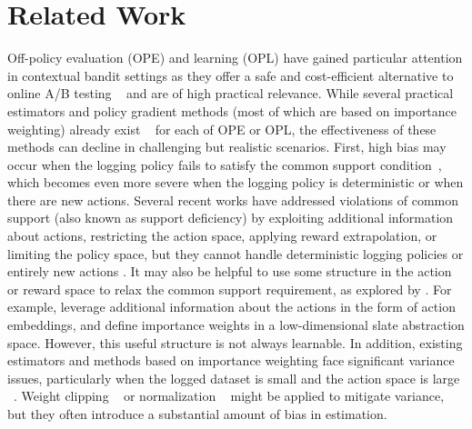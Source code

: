 \appendix
\section{Related Work} \label{app:related}
Off-policy evaluation (OPE) and learning (OPL) have gained particular attention in contextual bandit settings as they offer a safe and cost-efficient alternative to online A/B testing ~\citep{mehrotra2018towards,gilotte2018offline,saito2021evaluating,kiyohara2024towards} and are of high practical relevance. While several practical estimators and policy gradient methods (most of which are based on importance weighting) already exist ~\citep{saito2021counterfactual,uehara2022review,dudik2014doubly,wang2017optimal,su2020doubly} for each of OPE or OPL, the effectiveness of these methods can decline in challenging but realistic scenarios. First, high bias may occur when the logging policy fails to satisfy the common support condition~\citep{sachdeva2020off}, which becomes even more severe when the logging policy is deterministic or when there are new actions. Several recent works have addressed violations of common support (also known as support deficiency) by exploiting additional information about actions, restricting the action space, applying reward extrapolation, or limiting the policy space, but they cannot handle deterministic logging policies or entirely new actions \citep{felicioni2022off, sachdeva2020off}. It may also be helpful to use some structure in the action or reward space to relax the common support requirement, as explored by \cite{saito2022off,saito2023off,cief2024learning,taufiq2024marginal,sachdeva2024off,kiyohara2024off}. For example, \cite{saito2022off} leverage additional information about the actions in the form of action embeddings, and \cite{kiyohara2023off} define importance weights in a low-dimensional slate abstraction space. However, this useful structure is not always learnable.
In addition, existing estimators and methods based on importance weighting face significant variance issues, particularly when the logged dataset is small and the action space is large ~\citep{saito2022off,cief2024learning,sachdeva2024off}. Weight clipping ~\citep{swaminathan2015counterfactual,su2020doubly} or normalization ~\citep{swaminathan2015self} might be applied to mitigate variance, but they often introduce a substantial amount of bias in estimation.

